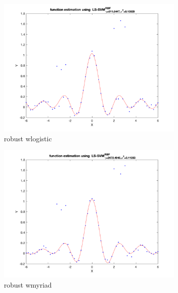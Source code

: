 \documentclass[a4paper, 11pt, one column]{article}
\begin{document}
\begin{figure}[h]
    \centering
    \begin{subfigure}{0.45\linewidth}
            \includegraphics[width=\linewidth]{images/robust_wlogistic.png}
            \caption{robust wlogistic}
        \end{subfigure}\hfil
        \begin{subfigure}{0.45\linewidth}
            \includegraphics[width=\linewidth]{images/robust_wmyriad.png}
            \caption{robust wmyriad}
        \end{subfigure}\hfil
        \begin{subfigure}{0.45\linewidth}

\end{subfigure}
\end{figure}
\end{document}
